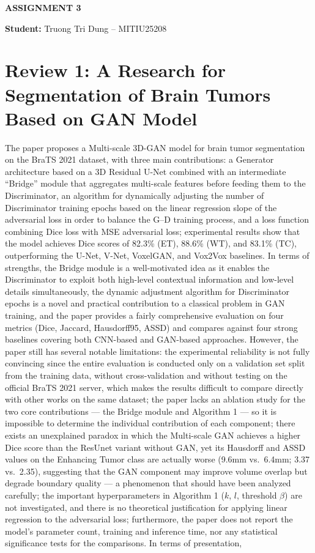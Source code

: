 \documentclass[12pt,a4paper]{article}
\begin{document}
\begin{center}
{\Large\textbf{ASSIGNMENT 3}}
\end{center}

\noindent\textbf{Student:} Truong Tri Dung -- MITIU25208

\section{Review 1: A Research for Segmentation of Brain Tumors Based on GAN Model}

The paper proposes a Multi-scale 3D-GAN model for brain tumor segmentation on the BraTS 2021 dataset, with three main contributions: a Generator architecture based on a 3D Residual U-Net combined with an intermediate ``Bridge'' module that aggregates multi-scale features before feeding them to the Discriminator, an algorithm for dynamically adjusting the number of Discriminator training epochs based on the linear regression slope of the adversarial loss in order to balance the G--D training process, and a loss function combining Dice loss with MSE adversarial loss; experimental results show that the model achieves Dice scores of 82.3\% (ET), 88.6\% (WT), and 83.1\% (TC), outperforming the U-Net, V-Net, VoxelGAN, and Vox2Vox baselines. In terms of strengths, the Bridge module is a well-motivated idea as it enables the Discriminator to exploit both high-level contextual information and low-level details simultaneously, the dynamic adjustment algorithm for Discriminator epochs is a novel and practical contribution to a classical problem in GAN training, and the paper provides a fairly comprehensive evaluation on four metrics (Dice, Jaccard, Hausdorff95, ASSD) and compares against four strong baselines covering both CNN-based and GAN-based approaches. However, the paper still has several notable limitations: the experimental reliability is not fully convincing since the entire evaluation is conducted only on a validation set split from the training data, without cross-validation and without testing on the official BraTS 2021 server, which makes the results difficult to compare directly with other works on the same dataset; the paper lacks an ablation study for the two core contributions --- the Bridge module and Algorithm 1 --- so it is impossible to determine the individual contribution of each component; there exists an unexplained paradox in which the Multi-scale GAN achieves a higher Dice score than the ResUnet variant without GAN, yet its Hausdorff and ASSD values on the Enhancing Tumor class are actually worse (9.6mm vs.\ 6.4mm; 3.37 vs.\ 2.35), suggesting that the GAN component may improve volume overlap but degrade boundary quality --- a phenomenon that should have been analyzed carefully; the important hyperparameters in Algorithm 1 ($k$, $l$, threshold $\beta$) are not investigated, and there is no theoretical justification for applying linear regression to the adversarial loss; furthermore, the paper does not report the model's parameter count, training and inference time, nor any statistical significance tests for the comparisons. In terms of presentation, 
\end{document}
